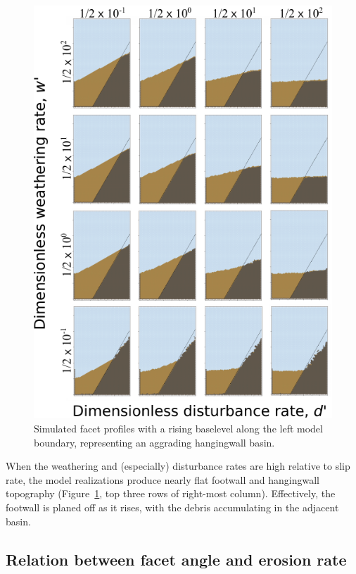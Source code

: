 \begin{figure}[ht!]
\centerline{\includegraphics[scale=1.5]{Figures/four_by_four_profiles_baselevel_rise.pdf}}
\caption{Simulated facet profiles with a rising baselevel along the left model boundary, representing an aggrading hangingwall basin.}
\label{fig:baselevelrise}
\end{figure}

When the weathering and (especially) disturbance rates are high relative to slip rate, the model realizations produce nearly flat footwall and hangingwall topography (Figure~\ref{fig:baselevelrise}, top three rows of right-most column). Effectively, the footwall is planed off as it rises, with the debris accumulating in the adjacent basin.

\subsection{Relation between facet angle and erosion rate}

